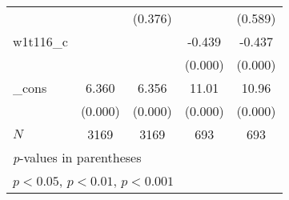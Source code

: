 {\begin{tabular}{l*{4}{c}}
            &                     &     (0.376)         &                     &     (0.589)         \\
[1em]
w1t116\_c    &                     &                     &      -0.439\sym{***}&      -0.437\sym{***}\\
            &                     &                     &     (0.000)         &     (0.000)         \\
[1em]
\_cons      &       6.360\sym{***}&       6.356\sym{***}&       11.01\sym{***}&       10.96\sym{***}\\
            &     (0.000)         &     (0.000)         &     (0.000)         &     (0.000)         \\
\hline
\(N\)       &        3169         &        3169         &         693         &         693         \\
\hline\hline
\multicolumn{5}{l}{\footnotesize \textit{p}-values in parentheses}\\
\multicolumn{5}{l}{\footnotesize \sym{*} \(p<0.05\), \sym{**} \(p<0.01\), \sym{***} \(p<0.001\)}\\
\end{tabular}
}
